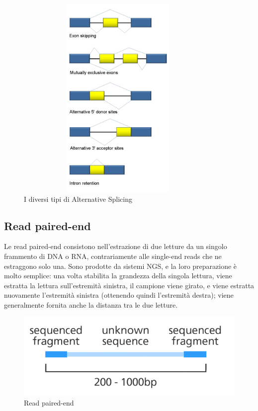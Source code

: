\newpage

\begin{figure}[t!]
	\centering
	\includegraphics[height=10cm,width=10cm]{images/alternativesplicingevents.jpg}
  \caption{I diversi tipi di Alternative Splicing}
  \label{fig:AlternativeSplicingTypes}
\end{figure}

\subsection{Read paired-end}
Le read paired-end consistono nell'estrazione di due letture da un singolo frammento di DNA o RNA, contrariamente alle single-end reads che ne estraggono solo una. Sono prodotte da sistemi NGS, e la loro preparazione è molto semplice: una volta stabilita la grandezza della singola lettura, viene estratta la lettura sull'estremità sinistra, il campione viene girato, e viene estratta nuovamente l'estremità sinistra (ottenendo quindi l'estremità destra); viene generalmente fornita anche la distanza tra le due letture.

\begin{figure}[h!]
	\centering
	\includegraphics{images/pairedendreads2.png}
  \caption{Read paired-end}
  \label{fig:PairedEndReads}
\end{figure}